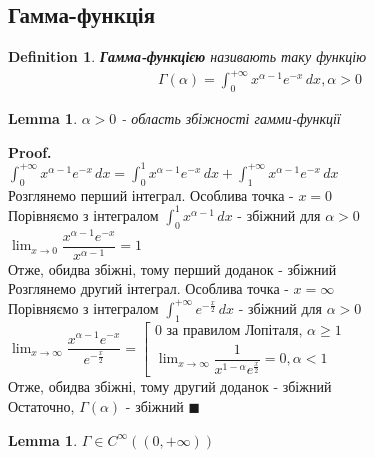 \documentclass[a4paper, 14pt]{extarticle}
\def\huge{\displaystyle}
\theoremstyle{theoremdd}
\theoremstyle{theoremdd}
\newtheorem{definition}[theorem]{Definition}
\theoremstyle{theoremdd}
\theoremstyle{theoremdd}
\theoremstyle{theoremdd}
\theoremstyle{theoremdd}
\theoremstyle{theoremdd}
\newtheorem{lemma}[theorem]{Lemma}
\theoremstyle{theoremdd}
\newenvironment{pf}{\vspace*{-3mm} \textbf{Proof. \\}}{$\blacksquare$}
\begin{document}
\subsection{Гамма-функція}
\begin{definition}
\textbf{Гамма-функцією} називають таку функцію
\begin{align*}
\Gamma(\alpha) = \huge \int_0^{+\infty} x^{\alpha-1}e^{-x}\,dx, \alpha > 0
\end{align*}
\end{definition}

\begin{lemma}
$\alpha > 0$ - область збіжності гамми-функції
\end{lemma}

\begin{pf}
$\huge \int_0^{+\infty} x^{\alpha-1}e^{-x}\,dx = \int_0^1 x^{\alpha-1}e^{-x}\,dx + \int_1^{+\infty} x^{\alpha-1}e^{-x}\,dx$\\
Розглянемо перший інтеграл. Особлива точка - $x = 0$\\
Порівняємо з інтегралом $\huge \int_0^1 x^{\alpha-1}\,dx$ - збіжний для $\alpha > 0$\\
$\huge \lim_{x \to 0} \dfrac{x^{\alpha-1} e^{-x}}{x^{\alpha -1}} = 1$\\
Отже, обидва збіжні, тому перший доданок - збіжний\\
Розглянемо другий інтеграл. Особлива точка - $x = \infty$\\
Порівняємо з інтегралом $\huge \int_1^{+\infty} e^{-\frac{x}{2}} \,dx$ - збіжний для $\alpha > 0$\\
$\huge \lim_{x \to \infty} \dfrac{x^{\alpha -1} e^{-x}}{e^{-\frac{x}{2}}} = \left[ \begin{gathered} 0 \textrm{ за правилом Лопіталя, } \alpha \geq 1 \\ \huge \lim_{x \to \infty} \dfrac{1}{x^{1-\alpha} e^{\frac{x}{2}}} = 0, \alpha < 1 \end{gathered} \right.$\\
Отже, обидва збіжні, тому другий доданок - збіжний\\
Остаточно, $\Gamma(\alpha)$ - збіжний
\end{pf}

\begin{lemma}
$\Gamma \in C^{\infty} ((0,+\infty))$
\end{lemma}
\end{document}
